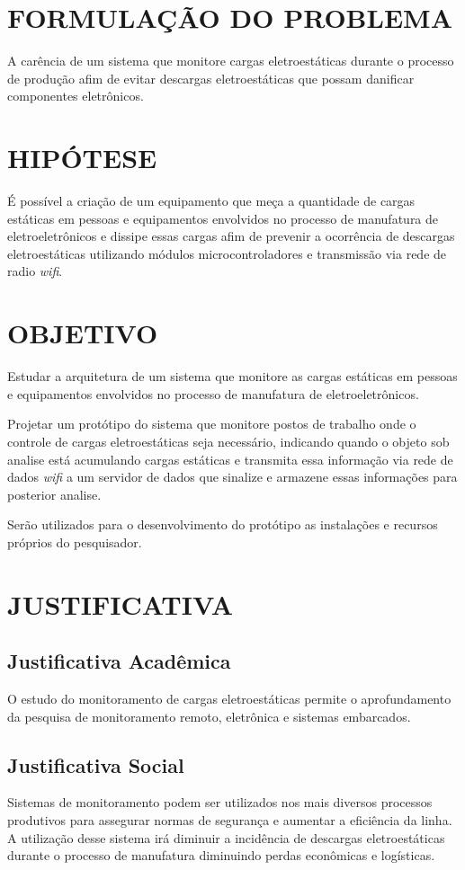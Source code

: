 \documentclass[
	12pt,				%
	openright,			%
	oneside,			%
	a4paper,			%
	chapter=TITLE,		%
	english,			%
	french,				%
	spanish,			%
	brazil,				%
	article,			%
	]{uea-abntex2}
\begin{document}
\section{FORMULAÇÃO DO PROBLEMA}
A carência de um sistema que monitore cargas eletroestáticas durante o processo de produção afim de evitar descargas eletroestáticas que possam danificar componentes eletrônicos.  
\section{HIPÓTESE}
É possível a criação de um equipamento que meça a quantidade de cargas estáticas em pessoas e equipamentos envolvidos no processo de manufatura de eletroeletrônicos e dissipe essas cargas afim de prevenir a ocorrência de descargas eletroestáticas utilizando módulos microcontroladores e transmissão via rede de radio \textit{wifi}. 
\section{OBJETIVO}
Estudar a arquitetura de um sistema que monitore as cargas estáticas em pessoas e equipamentos envolvidos no processo de manufatura de eletroeletrônicos.

Projetar um protótipo do sistema que monitore postos de trabalho onde o controle de cargas eletroestáticas seja necessário, indicando quando o objeto sob analise está acumulando cargas estáticas e transmita essa informação via rede de dados \textit{wifi} a um servidor de dados que sinalize e armazene essas informações para posterior analise.

Serão utilizados para o desenvolvimento do protótipo as instalações e recursos próprios do pesquisador.
\section{JUSTIFICATIVA}

\subsection{Justificativa Acadêmica}
O estudo do monitoramento de cargas eletroestáticas permite o aprofundamento da pesquisa de monitoramento remoto, eletrônica e sistemas embarcados.
\subsection{Justificativa Social}
Sistemas de monitoramento podem ser utilizados nos mais diversos processos produtivos para assegurar normas de segurança e aumentar a eficiência da linha.
A utilização desse sistema irá diminuir a incidência de descargas eletroestáticas durante o processo de manufatura diminuindo perdas econômicas e logísticas.
\end{document}
